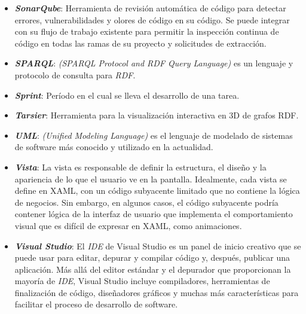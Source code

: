 \begin{itemize}
    \item \textbf{\textit{SonarQube}}: Herramienta de revisión automática 
    de código para detectar errores, vulnerabilidades y olores de código 
    en su código. Se puede integrar con su flujo de trabajo existente 
    para permitir la inspección continua de código en todas las ramas 
    de su proyecto y solicitudes de extracción.

    \item \textbf{\textit{SPARQL}}: \emph{(SPARQL Protocol and RDF Query 
    Language)} es un lenguaje y protocolo de consulta para \emph{RDF}. 

    \item \textbf{\textit{Sprint}}: Período en el cual se lleva el 
    desarrollo de una tarea.

    \item \textbf{\textit{Tarsier}}: Herramienta para la visualización 
    interactiva en 3D de grafos RDF.\@

    \item \textbf{\textit{UML}}: \emph{(Unified Modeling Language)} es el 
    lenguaje de modelado de sistemas de software más conocido y utilizado 
    en la actualidad.

    \item \textbf{\textit{Vista}}: La vista es responsable de definir 
    la estructura, el diseño y la apariencia de lo que el usuario ve 
    en la pantalla. Idealmente, cada vista se define en XAML, con un 
    código subyacente limitado que no contiene la lógica de negocios. 
    Sin embargo, en algunos casos, el código subyacente podría contener 
    lógica de la interfaz de usuario que implementa el comportamiento 
    visual que es difícil de expresar en XAML, como animaciones.

    \item \textbf{\textit{Visual Studio}}: El \emph{IDE} de Visual Studio 
    es un panel de inicio creativo que se puede usar para editar, 
    depurar y compilar código y, después, publicar una aplicación.
    Más allá del editor estándar y el depurador que proporcionan la 
    mayoría de \emph{IDE}, Visual Studio incluye compiladores, herramientas 
    de finalización de código, diseñadores gráficos y muchas más 
    características para facilitar el proceso de desarrollo de software.


\end{itemize}
